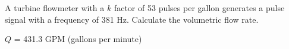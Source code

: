 

A turbine flowmeter with a $k$ factor of 53 pulses per gallon generates a pulse signal with a frequency of 381 Hz.  Calculate the volumetric flow rate.







$Q$ = 431.3 GPM (gallons per minute)










